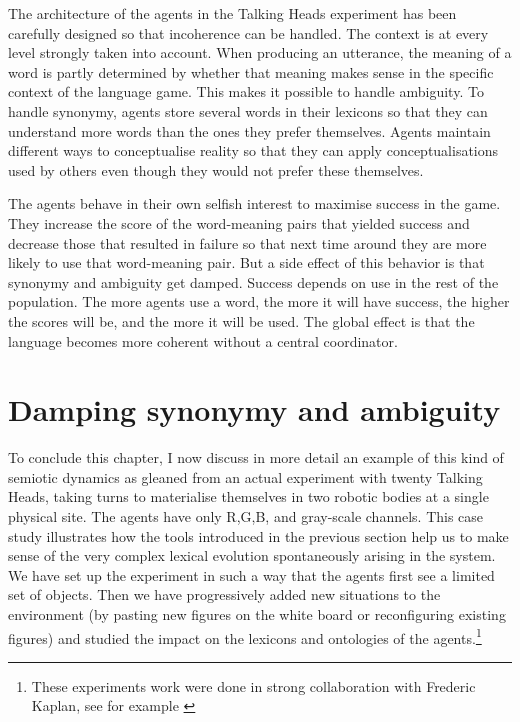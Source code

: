 The architecture of the agents in the Talking Heads
experiment has been carefully designed so that incoherence
can be handled. The context
is at every level strongly taken into account. When 
producing an utterance, the meaning of a word is partly
determined by whether
that meaning makes sense in the specific context
of the language game. This makes it possible to 
handle ambiguity. To handle synonymy, agents store several words in 
their lexicons so that they can understand more words
than the ones they prefer themselves. Agents maintain 
different ways to conceptualise reality so that 
they can apply conceptualisations used by others
even though they would not prefer these themselves. 

The agents behave in their own selfish interest to 
maximise success in the game. They increase the score 
of the word-meaning pairs that yielded success and decrease
those that resulted in failure so that next time around 
they are more likely to use that word-meaning pair. 
But a side effect of this behavior is 
that synonymy and ambiguity get damped. Success depends 
on use in the rest of the population. The more 
agents use a word, the more it will have success, 
the higher the scores will be, and the more it will be used. 
The global effect is that the language becomes more
coherent without a central coordinator. 

\section{Damping synonymy and ambiguity}

To conclude this chapter, I now discuss in more 
detail an example of this kind of semiotic dynamics as
gleaned from  an actual experiment with twenty Talking
Heads, taking turns to materialise themselves in two robotic 
bodies at a single physical site. The agents have 
only R,G,B, and gray-scale channels. This 
case study illustrates how the tools introduced in 
the previous section help us to make sense of
the very complex lexical evolution spontaneously 
arising in the system. We have set up the experiment
in such a way that the agents first see a limited set 
of objects. Then we
have progressively added new situations
to the environment (by pasting new figures on 
the white board or reconfiguring existing figures) and studied
the impact on the lexicons and ontologies of the agents.\footnote{
These experiments work were done in strong collaboration with 
Frederic Kaplan, see for example \cite{Steels:1999}}

